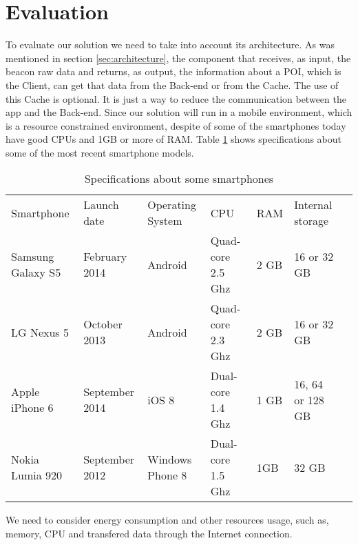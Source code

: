 
% 
% 

\section{Evaluation}
\label{sec:evaluation}


To evaluate our solution we need to take into account its
architecture. As was mentioned in section \ref{sec:architecture},
the component that receives, as input, the beacon raw data and
returns, as output, the information about a POI, which is the
Client, can get that data from the Back-end or from the Cache.
The use of this Cache is optional. It is just a way to reduce
the communication between the app and the Back-end.
Since our solution will run in a mobile environment, 
which is a resource constrained environment,
despite of some of the smartphones today have
good CPUs and 1GB or more of RAM.
Table \ref{tab:smartphones} shows specifications about some 
of the most recent smartphone models.
\begin{table}[h]
\centering
\begin{tabular}{|l|l|l|l|l|l|l}
\cline{1-6}
Smartphone & Launch date & Operating System & CPU & RAM & Internal storage
\\
\cline{1-6}
Samsung Galaxy S5 & February 2014 & Android & Quad-core 2.5 Ghz & 2 GB & 16 or 32 GB
\\
\cline{1-6}
LG Nexus 5 & October 2013 & Android & Quad-core 2.3 Ghz & 2 GB & 16 or 32 GB
\\
\cline{1-6}
Apple iPhone 6 & September 2014 & iOS 8 & Dual-core 1.4 Ghz & 1 GB & 16, 64 or 128 GB
\\
\cline{1-6}
Nokia Lumia 920 & September 2012 & Windows Phone 8 & Dual-core 1.5 Ghz & 1GB & 32 GB
\\
\hline
\end{tabular}
\caption{Specifications about some smartphones}
\label{tab:smartphones}
\end{table}
We need to consider energy consumption and other resources
usage, such as, memory, CPU and transfered data through the
Internet connection.

